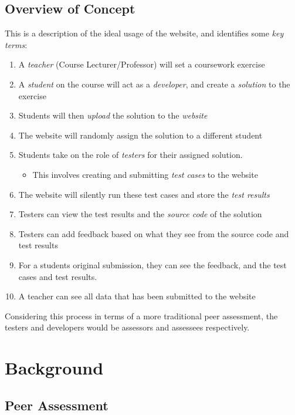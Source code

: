\documentclass[a4paper,11pt]{report}
\begin{document}
\newpage
\section{Overview of Concept}
This is a description of the ideal usage of the website, and identifies some \textit{key terms}:
\begin{enumerate}
 \item A \textit{teacher} (Course Lecturer/Professor) will set a coursework exercise
 \item A \textit{student} on the course will act as a \textit{developer}, and create a \textit{solution} to the exercise
 \item Students will then \textit{upload} the solution to the \textit{website}
 \item The website will randomly assign the solution to a different student
 \item Students take on the role of \textit{testers} for their assigned solution.
    \begin{itemize}
    \item This involves creating and submitting \textit{test cases} to the website
    \end{itemize}
 \item The website will silently run these test cases and store the \textit{test results}
 \item Testers can view the test results and the \textit{source code} of the solution
 \item Testers can add feedback based on what they see from the source code and test results
 \item For a students original submission, they can see the feedback, and the test cases and test results.
 \item A teacher can see all data that has been submitted to the website 
\end{enumerate}
Considering this process in terms of a more traditional peer assessment, the testers and developers would be assessors and assessees respectively.


\chapter{Background}
\section{Peer Assessment}
\end{document}
